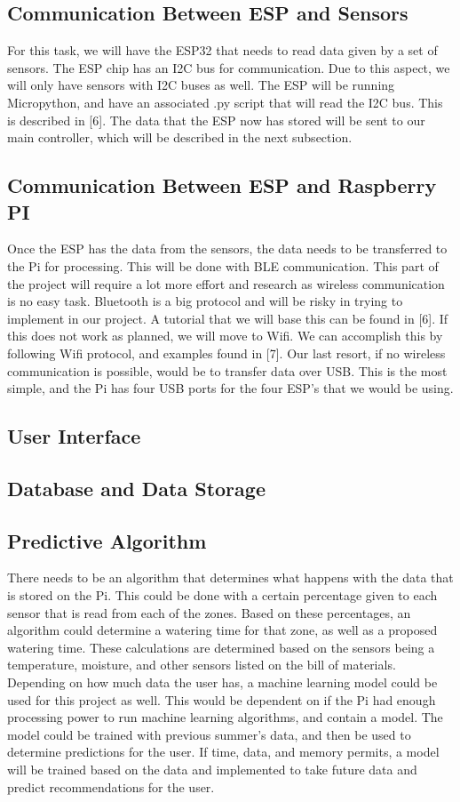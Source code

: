 \documentclass[letterpaper, 10 pt, conference]{ieeeconf}  %
\begin{document}
\subsection{Communication Between ESP and Sensors}
For this task, we will have the ESP32 that needs to read data given by a set of sensors. The ESP chip has an I2C bus for communication. Due to this aspect, we will only have sensors with I2C buses as well. The ESP will be running Micropython, and have an associated .py script that will read the I2C bus. This is described in [6]. The data that the ESP now has stored will be sent to our main controller, which will be described in the next subsection.

\subsection{Communication Between ESP and Raspberry PI}
Once the ESP has the data from the sensors, the data needs to be transferred to the Pi for processing. This will be done with BLE communication. This part of the project will require a lot more effort and research as wireless communication is no easy task. Bluetooth is a big protocol and will be risky in trying to implement in our project. A tutorial that we will base this can be found in [6]. If this does not work as planned, we will move to Wifi. We can accomplish this by following Wifi protocol, and examples found in [7]. Our last resort, if no wireless communication is possible, would be to transfer data over USB. This is the most simple, and the Pi has four USB ports for the four ESP's that we would be using.

\subsection{User Interface}

\subsection{Database and Data Storage}

\subsection{Predictive Algorithm}
There needs to be an algorithm that determines what happens with the data that is stored on the Pi. This could be done with a certain percentage given to each sensor that is read from each of the zones. Based on these percentages, an algorithm could determine a watering time for that zone, as well as a proposed watering time. These calculations are determined based on the sensors being a temperature, moisture, and other sensors listed on the bill of materials. Depending on how much data the user has, a machine learning model could be used for this project as well. This would be dependent on if the Pi had enough processing power to run machine learning algorithms, and contain a model. The model could be trained with previous summer's data, and then be used to determine predictions for the user. If time, data, and memory permits, a model will be trained based on the data and implemented to take future data and predict recommendations for the user. 
\end{document}
